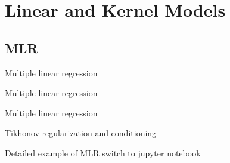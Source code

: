 \section{Linear and Kernel Models}
\subsection{MLR}
\begin{frame}{Multiple linear regression}

\end{frame}
\begin{frame}{Multiple linear regression}

\end{frame}
\begin{frame}{Multiple linear regression}

\end{frame}
\begin{frame}{Tikhonov regularization and conditioning}

\end{frame}
\begin{frame}{Detailed example of MLR}
switch  to jupyter notebook
\end{frame}
%
%
%
%
%
%
%
